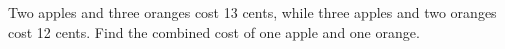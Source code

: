 Two apples and three oranges cost 13 cents, while three apples and two oranges cost 12 cents. Find the combined cost of one apple and one orange.
